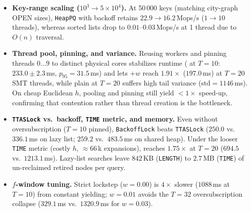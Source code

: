 \begin{itemize}[nosep]
  \item \textbf{Key-range scaling ($10^3 \rightarrow 5\times 10^4$).} At 50\,000 keys (matching city-graph OPEN sizes), \texttt{HeapPQ} with backoff retains $22.9 \rightarrow 16.2$\,Mops/s ($1 \rightarrow 10$ threads), whereas sorted lists drop to $0.01$--$0.03$\,Mops/s at 1 thread due to $O(n)$ traversal.
  \item \textbf{Thread pool, pinning, and variance.} Reusing workers and pinning threads $0\dots 9$ to distinct physical cores stabilizes runtime (\HDA{} at $T=10$: $233.0 \pm 2.3$\,ms, $p_{95}=31.5$\,ms) and lets \HDA{}+$w$ reach $1.91\times$ ($197.0$\,ms) at $T=20$ SMT threads, while plain \HDA{} at $T=20$ suffers high tail variance ($\mathrm{std}=1146$\,ms). On cheap Euclidean $h$, pooling and pinning still yield $<1\times$ speed-up, confirming that contention rather than thread creation is the bottleneck.
  \item \textbf{\texttt{TTASLock} vs.\ backoff, \texttt{TIME} metric, and memory.} Even without oversubscription ($T=10$ pinned), \texttt{BackoffLock} beats \texttt{TTASLock} ($250.0$ vs.\ $336.1$\,ms on lazy list; $259.2$ vs.\ $483.5$\,ms on shared heap). Under the looser \texttt{TIME} metric (costly $h$, $\approx 66$\,k expansions), \HDA{} reaches $1.75\times$ at $T=20$ ($694.5$ vs.\ $1213.1$\,ms). Lazy-list searches leave $842$\,KB (\texttt{LENGTH}) to $2.7$\,MB (\texttt{TIME}) of un-reclaimed retired nodes per query.
  \item \textbf{$f$-window tuning.} Strict lockstep ($w=0.00$) is $4\times$ slower ($1088$\,ms at $T=10$) from constant yielding; $w=0.01$ avoids the $T=32$ oversubscription collapse ($329.1$\,ms vs.\ $1320.9$\,ms for $w=0.03$).
\end{itemize}

